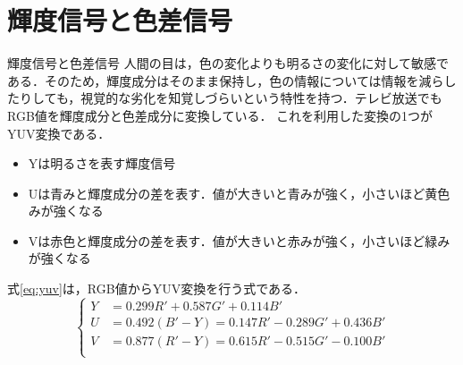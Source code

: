 \documentclass[8pt, jfont=ipaexm, t]{beamer} %
\begin{document}
\section{輝度信号と色差信号}
\begin{frame}{輝度信号と色差信号}
人間の目は，色の変化よりも明るさの変化に対して敏感である．そのため，輝度成分はそのまま保持し，色の情報については情報を減らしたりしても，視覚的な劣化を知覚しづらいという特性を持つ．テレビ放送でもRGB値を輝度成分と色差成分に変換している．
これを利用した変換の1つがYUV変換である． 
\begin{itemize}
  \item Yは明るさを表す輝度信号 
  \item Uは青みと輝度成分の差を表す．値が大きいと青みが強く，小さいほど黄色みが強くなる
  \item Vは赤色と輝度成分の差を表す．値が大きいと赤みが強く，小さいほど緑みが強くなる
\end{itemize}
式\eqref{eq:yuv}は，RGB値からYUV変換を行う式である．
\begin{equation} \label{eq:yuv}
\begin{cases}
Y &= 0.299R' + 0.587G' + 0.114B' \\
U &= 0.492(B' - Y) = 0.147R' - 0.289G' + 0.436B' \\
V &= 0.877(R' - Y) = 0.615R' - 0.515G' - 0.100B' \\
\end{cases}
\end{equation}
\end{frame}
\end{document}
